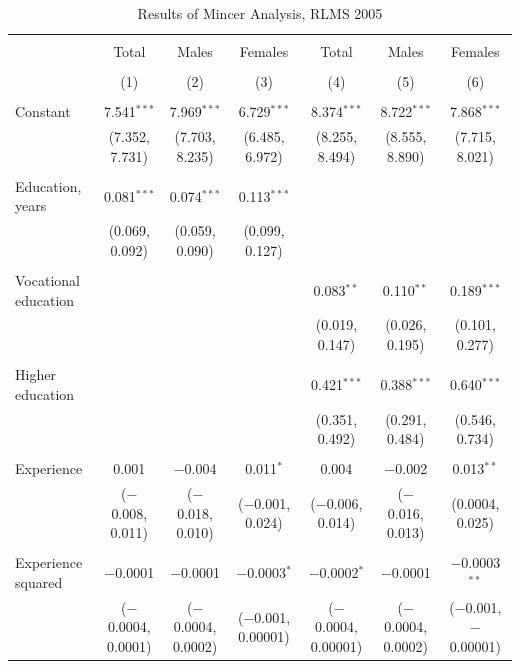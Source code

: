\documentclass[alpha-refs]{wiley-article-01g}
\begin{document}
\begin{landscape}
	
	\fontsize{9}{11}
	\selectfont
	
	\begin{table}[!htbp] \centering 
\renewcommand{\arraystretch}{1.0}
		\caption{Results of Mincer Analysis, RLMS 2005} 
		\label{} 
		\begin{tabular}{@{\extracolsep{5pt}}lcccccc} 
			\\[-.8ex]\hline 
			\hline \\[-.8ex] 
			& Total & Males & Females & Total & Males & Females \\ 
			\\[-.8ex] & (1) & (2) & (3) & (4) & (5) & (6)\\ 
			\hline \\[-.8ex] 
			Constant & 7.541$^{***}$ & 7.969$^{***}$ & 6.729$^{***}$ & 8.374$^{***}$ & 8.722$^{***}$ & 7.868$^{***}$ \\ 
			& (7.352, 7.731) & (7.703, 8.235) & (6.485, 6.972) & (8.255, 8.494) & (8.555, 8.890) & (7.715, 8.021) \\ 
			& & & & & & \\ 
			Education, years & 0.081$^{***}$ & 0.074$^{***}$ & 0.113$^{***}$ &  &  &  \\ 
			& (0.069, 0.092) & (0.059, 0.090) & (0.099, 0.127) &  &  &  \\ 
			& & & & & & \\ 
			Vocational education &  &  &  & 0.083$^{**}$ & 0.110$^{**}$ & 0.189$^{***}$ \\ 
			&  &  &  & (0.019, 0.147) & (0.026, 0.195) & (0.101, 0.277) \\ 
			& & & & & & \\ 
			Higher education &  &  &  & 0.421$^{***}$ & 0.388$^{***}$ & 0.640$^{***}$ \\ 
			&  &  &  & (0.351, 0.492) & (0.291, 0.484) & (0.546, 0.734) \\ 
			& & & & & & \\ 
			Experience & 0.001 & $-$0.004 & 0.011$^{*}$ & 0.004 & $-$0.002 & 0.013$^{**}$ \\ 
			& ($-$0.008, 0.011) & ($-$0.018, 0.010) & ($-$0.001, 0.024) & ($-$0.006, 0.014) & ($-$0.016, 0.013) & (0.0004, 0.025) \\ 
			& & & & & & \\ 
			Experience squared & $-$0.0001 & $-$0.0001 & $-$0.0003$^{*}$ & $-$0.0002$^{*}$ & $-$0.0001 & $-$0.0003$^{**}$ \\ 
			& ($-$0.0004, 0.0001) & ($-$0.0004, 0.0002) & ($-$0.001, 0.00001) & ($-$0.0004, 0.00001) & ($-$0.0004, 0.0002) & ($-$0.001, $-$0.00001) \\ 

\end{tabular}
\end{table}
\end{landscape}
\end{document}
